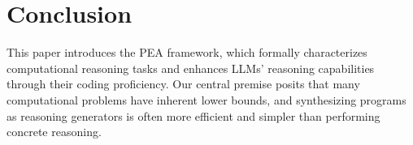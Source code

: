 \section{Conclusion}This paper introduces the PEA framework, which formally characterizes computational reasoning tasks and enhances LLMs' reasoning capabilities through their coding proficiency. Our central premise posits that many computational problems have inherent lower bounds, and synthesizing programs as reasoning generators is often more efficient and simpler than performing concrete reasoning.




